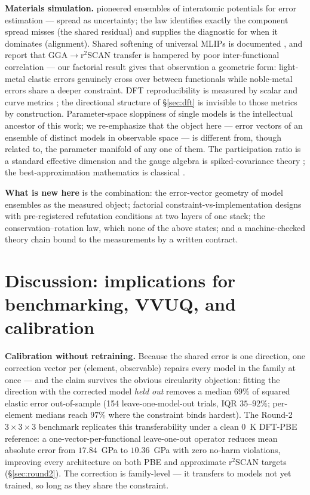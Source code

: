 \documentclass[11pt]{article}
\theoremstyle{remark}
\begin{document}
\textbf{Materials simulation.} \citep{frederiksen2004} pioneered ensembles of
interatomic potentials for error estimation --- spread as uncertainty; the law
identifies exactly the component spread misses (the shared residual) and
supplies the diagnostic for when it dominates (alignment). Shared softening of
universal MLIPs is documented \citep{deng2025softening,yu2024}, and
\citep{huang2025} report that GGA$\to$r$^2$SCAN transfer is hampered by poor
inter-functional correlation --- our factorial result gives that observation a
geometric form: light-metal elastic errors genuinely cross over between
functionals while noble-metal errors share a deeper constraint.
DFT reproducibility is measured by scalar and curve metrics
\citep{lejaeghere2016,bosoni2024}; the directional structure of
\S\ref{sec:dft} is invisible to those metrics by construction. Parameter-space
sloppiness of single models \citep{transtrum2011,machta2013,quinn2023,kurniawan2022}
is the intellectual ancestor of this work; we re-emphasize that the object here
--- error vectors of an ensemble of distinct models in observable space --- is
different from, though related to, the parameter manifold of any one of them.
The participation ratio is a standard effective dimension \citep{gao2015} and
the gauge algebra is spiked-covariance theory \citep{johnstone2001}; the
best-approximation mathematics is classical \citep{deutsch2001,kinderlehrer1980}.

\textbf{What is new here} is the combination: the error-vector geometry of
model ensembles as the measured object; factorial constraint-vs-implementation
designs with pre-registered refutation conditions at two layers of one stack;
the conservation--rotation law, which none of the above states; and a
machine-checked theory chain bound to the measurements by a written contract.

\section{Discussion: implications for benchmarking, VVUQ, and calibration}
\label{sec:implications}

\textbf{Calibration without retraining.} Because the shared error is one
direction, one correction vector per (element, observable) repairs every model
in the family at once --- and the claim survives the obvious circularity
objection: fitting the direction with the corrected model \emph{held out}
removes a median $69\%$ of squared elastic error out-of-sample (154
leave-one-model-out trials, IQR $35$--$92\%$; per-element medians reach
$97\%$ where the constraint binds hardest). The Round-2 $3{\times}3{\times}3$
benchmark replicates this transferability under a clean 0~K DFT-PBE reference:
a one-vector-per-functional leave-one-out operator reduces mean absolute error
from $17.84$~GPa to $10.36$~GPa with zero no-harm violations, improving every
architecture on both PBE and approximate r$^2$SCAN targets
(\S\ref{sec:round2}). The correction is family-level --- it transfers to
models not yet trained, so long as they share the constraint.
\end{document}
